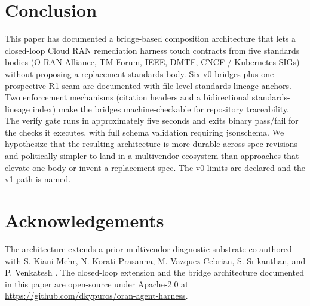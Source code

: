 \documentclass[twocolumn,10pt,a4paper]{article}
\begin{document}
\section{Conclusion}
\label{sec:conclude}

This paper has documented a bridge-based composition architecture that lets a closed-loop Cloud RAN remediation harness touch contracts from five standards bodies (O-RAN Alliance, TM Forum, IEEE, DMTF, CNCF / Kubernetes SIGs) without proposing a replacement standards body. Six v0 bridges plus one prospective R1 seam are documented with file-level standards-lineage anchors. Two enforcement mechanisms (citation headers and a bidirectional standards-lineage index) make the bridges machine-checkable for repository traceability. The verify gate runs in approximately five seconds and exits binary pass/fail for the checks it executes, with full schema validation requiring jsonschema. We hypothesize that the resulting architecture is more durable across spec revisions and politically simpler to land in a multivendor ecosystem than approaches that elevate one body or invent a replacement spec. The v0 limits are declared and the v1 path is named.

\section*{Acknowledgements}

The architecture extends a prior multivendor diagnostic substrate co-authored with S. Kiani Mehr, N. Korati Prasanna, M. Vazquez Cebrian, S. Srikanthan, and P. Venkatesh \cite{multivendor_blog_2026}. The closed-loop extension and the bridge architecture documented in this paper are open-source under Apache-2.0 at \url{https://github.com/dkypuros/oran-agent-harness}.



\end{document}
